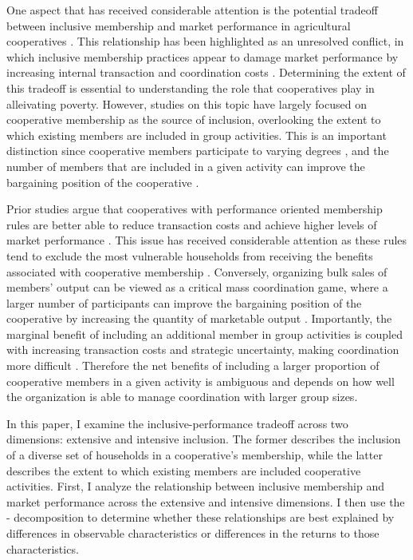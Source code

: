 \documentclass[11pt]{article}
\begin{document}
One aspect that has received considerable attention is the potential tradeoff between inclusive membership and market performance in agricultural cooperatives \citep{bernard_reaching_2009,world_bank_world_2008}. This relationship has been highlighted as an unresolved conflict, in which inclusive membership practices appear to damage market performance by increasing internal transaction and coordination costs \citep{berdegue_cooperating_2001,world_bank_world_2008}. Determining the extent of this tradeoff is essential to understanding the role that cooperatives play in alleivating poverty. However, studies on this topic have largely focused on cooperative membership as the source of inclusion, overlooking the extent to which existing members are included in group activities. This is an important distinction since cooperative members participate to varying degrees \citep{fischer_smallholder_2014}, and the number of members that are included in a given activity can improve the bargaining position of the cooperative \citep{aflagah_cheap_2019}.

Prior studies argue that cooperatives with performance oriented membership rules are better able to reduce transaction costs and achieve higher levels of market performance \citep{berdegue_cooperating_2001,bernard_reaching_2009}. This issue has received considerable attention as these rules tend to exclude the most vulnerable households from receiving the benefits associated with cooperative membership \citep{world_bank_world_2008}. %
Conversely, organizing bulk sales of members' output can be viewed as a critical mass coordination game, where a larger number of participants can improve the bargaining position of the cooperative by increasing the quantity of marketable output \citep{aflagah_cheap_2019}. Importantly, the marginal benefit of including an additional member in group activities is coupled with increasing transaction costs and strategic uncertainty, making coordination more difficult \citep{aflagah_cheap_2019}. Therefore the net benefits of including a larger proportion of cooperative members in a given activity is ambiguous and depends on how well the organization is able to manage coordination with larger group sizes. 

In this paper, I examine the inclusive-performance tradeoff across two dimensions: extensive and intensive inclusion. The former describes the inclusion of a diverse set of households in a cooperative's membership, while the latter describes the extent to which existing members are included cooperative activities. First, I analyze the relationship between inclusive membership and market performance across the extensive and intensive dimensions. I then use the \citet{oaxaca_male-female_1973}-\citet{blinder_wage_1973} decomposition to determine whether these relationships are best explained by differences in observable characteristics or differences in the returns to those characteristics. 
\end{document}
